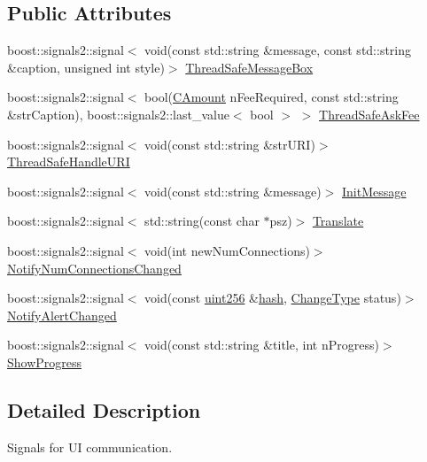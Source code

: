 \subsection*{Public Attributes}
\begin{DoxyCompactItemize}
\item 
boost\+::signals2\+::signal$<$ void(const std\+::string \&message, const std\+::string \&caption, unsigned int style)$>$ \hyperlink{class_c_client_u_i_interface_ab3f23c730300df11cf9ff369fbae0635}{Thread\+Safe\+Message\+Box}
\item 
boost\+::signals2\+::signal$<$ bool(\hyperlink{amount_8h_a4eaf3a5239714d8c45b851527f7cb564}{C\+Amount} n\+Fee\+Required, const std\+::string \&str\+Caption), boost\+::signals2\+::last\+\_\+value$<$ bool $>$ $>$ \hyperlink{class_c_client_u_i_interface_a11db1bca5727c45f52714bc63108ce6a}{Thread\+Safe\+Ask\+Fee}
\item 
boost\+::signals2\+::signal$<$ void(const std\+::string \&str\+U\+R\+I)$>$ \hyperlink{class_c_client_u_i_interface_a307f12eb3aadb694a82eb16714441d75}{Thread\+Safe\+Handle\+U\+R\+I}
\item 
boost\+::signals2\+::signal$<$ void(const std\+::string \&message)$>$ \hyperlink{class_c_client_u_i_interface_abc63cc3f3e5e15632f713d859dbc6bc2}{Init\+Message}
\item 
boost\+::signals2\+::signal$<$ std\+::string(const char $\ast$psz)$>$ \hyperlink{class_c_client_u_i_interface_a996160f65965769cf7fc50e6fd17dc9a}{Translate}
\item 
boost\+::signals2\+::signal$<$ void(int new\+Num\+Connections)$>$ \hyperlink{class_c_client_u_i_interface_a496995d44db8dc3e3ef84d345e25967d}{Notify\+Num\+Connections\+Changed}
\item 
boost\+::signals2\+::signal$<$ void(const \hyperlink{classuint256}{uint256} \&\hyperlink{cache_8cc_a11ecb029164e055f28f4123ce3748862}{hash}, \hyperlink{ui__interface_8h_a293ba931937e469a6327b8d6b4872969}{Change\+Type} status)$>$ \hyperlink{class_c_client_u_i_interface_a2c42ebdda06512513445cd86881b157a}{Notify\+Alert\+Changed}
\item 
boost\+::signals2\+::signal$<$ void(const std\+::string \&title, int n\+Progress)$>$ \hyperlink{class_c_client_u_i_interface_a64e516e507dd74f3639c51dffa645af2}{Show\+Progress}
\end{DoxyCompactItemize}


\subsection{Detailed Description}
Signals for U\+I communication. 

